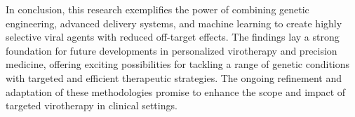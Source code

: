 \documentclass{article}
\begin{document}
In conclusion, this research exemplifies the power of combining genetic engineering, advanced delivery systems, and machine learning to create highly selective viral agents with reduced off-target effects. The findings lay a strong foundation for future developments in personalized virotherapy and precision medicine, offering exciting possibilities for tackling a range of genetic conditions with targeted and efficient therapeutic strategies. The ongoing refinement and adaptation of these methodologies promise to enhance the scope and impact of targeted virotherapy in clinical settings.
\end{document}
